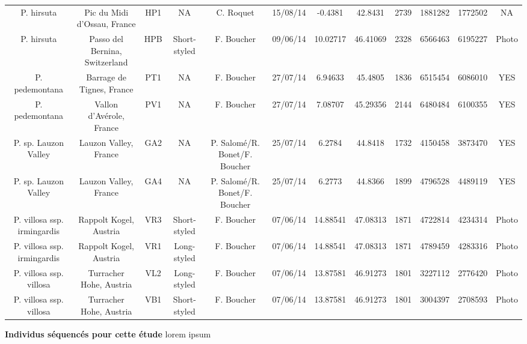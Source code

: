 \documentclass[12pt,a4paper,notitlepage,colorinlistoftodos]{article}
\begin{document}
\begin{landscape}
\begin{annexe}
{\begin{tabular}{cccccccccccc}
P. hirsuta &Pic du Midi d'Ossau, France &HP1 & NA &C. Roquet &15/08/14 & -0.4381 & 42.8431 &2739&1881282&1772502& NA \\
P. hirsuta &Passo del Bernina, Switzerland &HPB &Short-styled &F. Boucher &09/06/14 & 10.02717 & 46.41069 &2328&6566463&6195227&Photo \\
P. pedemontana &Barrage de Tignes, France &PT1 & NA &F. Boucher &27/07/14 & 6.94633 & 45.4805 &1836&6515454&6086010&YES \\
P. pedemontana &Vallon d'Avérole, France &PV1 & NA &F. Boucher &27/07/14 & 7.08707 & 45.29356 &2144&6480484&6100355&YES \\
P. sp. Lauzon Valley &Lauzon Valley, France &GA2 & NA &P. Salomé/R. Bonet/F. Boucher &25/07/14 & 6.2784 & 44.8418 &1732&4150458&3873470&YES \\
P. sp. Lauzon Valley &Lauzon Valley, France &GA4 & NA &P. Salomé/R. Bonet/F. Boucher &25/07/14 & 6.2773 & 44.8366 &1899&4796528&4489119&YES \\
P. villosa ssp. irmingardis &Rappolt Kogel, Austria &VR3 &Short-styled &F. Boucher &07/06/14 & 14.88541 & 47.08313 &1871&4722814&4234314&Photo \\
P. villosa ssp. irmingardis &Rappolt Kogel, Austria &VR1 &Long-styled &F. Boucher &07/06/14 & 14.88541 & 47.08313 &1871&4789459&4283316&Photo \\
P. villosa ssp. villosa &Turracher Hohe, Austria &VL2 &Long-styled &F. Boucher &07/06/14 & 13.87581 & 46.91273 &1801&3227112&2776420&Photo \\
P. villosa ssp. villosa &Turracher Hohe, Austria &VB1 &Short-styled &F. Boucher &07/06/14 & 13.87581 & 46.91273 &1801&3004397&2708593&Photo \\
	\bottomrule
	\end{tabular}}
	\caption{\textbf{Individus séquencés pour cette étude} lorem ipsum}
	\label{table_ind}
\end{annexe}
\end{landscape}
\end{document}
